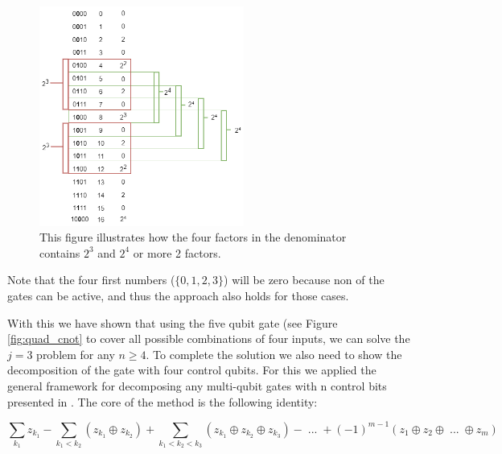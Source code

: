 \documentclass[12pt,a4paper]{article}
\begin{document}
\begin{figure}[htbp] 
    \centering \includegraphics[width=0.6\textwidth]{Figures/Binomial_explanation.png} 
    \caption{This figure illustrates how the four factors in the denominator contains \(2^3\) and \(2^4\) or more 2 factors.} 
    \label{fig:n4j2} 
\end{figure}

Note that the four first numbers (\(\{0, 1, 2, 3\}\)) will be zero because non of the gates can be active, and thus the approach also holds for those cases.

With this we have shown that using the five qubit gate (see Figure \ref{fig:quad_cnot} to cover all possible combinations of four inputs, we can solve the \(j=3\) problem for any \(n \ge 4\). To complete the solution we also need to show the decomposition of the gate with four control qubits. For this we applied the general framework for decomposing any multi-qubit gates with n control bits presented in \cite[p.17-18]{barenco_elementary_1995}. The core of the method is the following identity:

\[
    \sum_{k_1}z_{k_1} - \sum_{k_1 < k_2}(z_{k_1} \oplus z_{k_2}) 
    + \sum_{k_1 < k_2 < k_3}(z_{k_1} \oplus z_{k_2}\oplus z_{k_3}) 
    - \; ... \;+ (-1)^{m-1} (z_{1} \oplus z_{2}\oplus \; ... \; \oplus z_{m})\] 
\end{document}
